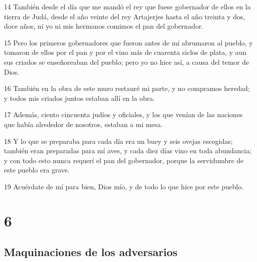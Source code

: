 \par 14 También desde el día que me mandó el rey que fuese gobernador de ellos en la tierra de Judá, desde el año veinte del rey Artajerjes hasta el año treinta y dos, doce años, ni yo ni mis hermanos comimos el pan del gobernador.
\par 15 Pero los primeros gobernadores que fueron antes de mí abrumaron al pueblo, y tomaron de ellos por el pan y por el vino más de cuarenta siclos de plata,  y aun sus criados se enseñoreaban del pueblo; pero yo no hice así, a causa del temor de Dios.
\par 16 También en la obra de este muro restauré mi parte, y no compramos heredad; y todos mis criados juntos estaban allí en la obra.
\par 17 Además, ciento cincuenta judíos y oficiales, y los que venían de las naciones que había alrededor de nosotros, estaban a mi mesa.
\par 18 Y lo que se preparaba para cada día era un buey y seis ovejas escogidas; también eran preparadas para mí aves, y cada diez días vino en toda abundancia; y con todo esto nunca requerí el pan del gobernador, porque la servidumbre de este pueblo era grave.
\par 19 Acuérdate de mí para bien, Dios mío, y de todo lo que hice por este pueblo.

\chapter{6}

\section*{Maquinaciones de los adversarios}

